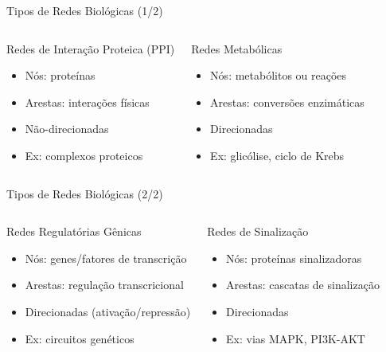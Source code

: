 \begin{frame}[shrink=5]{Tipos de Redes Biológicas (1/2)}
\begin{columns}
\begin{block}{Redes de Interação Proteica (PPI)}
\begin{itemize}
    \item Nós: proteínas
    \item Arestas: interações físicas
    \item Não-direcionadas
    \item Ex: complexos proteicos
\end{itemize}
\end{block}

\begin{block}{Redes Metabólicas}
\begin{itemize}
    \item Nós: metabólitos ou reações
    \item Arestas: conversões enzimáticas
    \item Direcionadas
    \item Ex: glicólise, ciclo de Krebs
\end{itemize}
\end{block}
\end{columns}
\end{frame}

\begin{frame}[shrink=5]{Tipos de Redes Biológicas (2/2)}
\begin{columns}
\begin{block}{Redes Regulatórias Gênicas}
\begin{itemize}
    \item Nós: genes/fatores de transcrição
    \item Arestas: regulação transcricional
    \item Direcionadas (ativação/repressão)
    \item Ex: circuitos genéticos
\end{itemize}
\end{block}

\begin{block}{Redes de Sinalização}
\begin{itemize}
    \item Nós: proteínas sinalizadoras
    \item Arestas: cascatas de sinalização
    \item Direcionadas
    \item Ex: vias MAPK, PI3K-AKT
\end{itemize}
\end{block}
\end{columns}
\end{frame}

